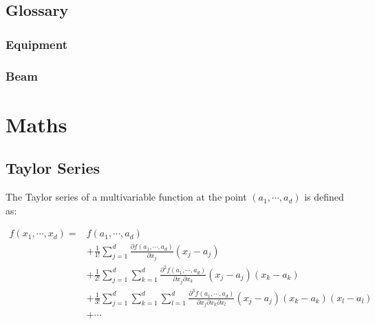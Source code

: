 \documentclass[openright,twoside,headsepline,bibliography=totoc]{scrbook}
\begin{document}
\newpage

\hypertarget{glossary}{%
\subsection{Glossary}\label{glossary}}

\renewcommand{\glossarysection}[2][]{}
\renewcommand*{\glspostdescription}{\vspace{-8pt}}
\glsnoexpandfields

\hypertarget{equipment}{%
\subsubsection{Equipment}\label{equipment}}

\glsaddall
\vspace{-6\parskip}
\printglossary[type=equipment]

\hypertarget{beam}{%
\subsubsection{Beam}\label{beam}}

\glsaddall
\vspace{-6\parskip}
\printglossary[type=beam]

\newpage

\hypertarget{maths}{%
\section{Maths}\label{maths}}

\hypertarget{taylor-series}{%
\subsection{Taylor Series}\label{taylor-series}}

The Taylor series of a multivariable function at the point
\((a_1, \cdots, a_d)\) is defined as:

\begin{equation}\begin{aligned}
  f(x_1, \cdots, x_d) = &f(a_1, \cdots, a_d) \\
                &+ \frac{1}{1!} \sum_{j=1}^{d} \frac{\partial f(a_1, \cdots, a_d)}{\partial x_j} (x_j - a_j) \\
                &+ \frac{1}{2!}\sum_{j=1}^{d}\sum_{k=1}^{d} \frac{\partial^2 f(a_1, \cdots, a_d)}{\partial x_j\partial x_k} (x_j - a_j) (x_k - a_k) \\
                &+ \frac{1}{3!}\sum_{j=1}^{d}\sum_{k=1}^{d}\sum_{l=1}^{d} \frac{\partial^3 f(a_1, \cdots, a_d)}{\partial x_j\partial x_k\partial x_l} (x_j - a_j) (x_k - a_k) (x_l - a_l)\\
                &+ \cdots
\end{aligned}\label{eq:taylor}\end{equation}
\end{document}
